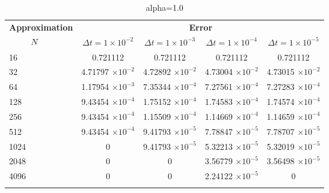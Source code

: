 	\begin{table}
		\begin{tabular}{lcccc}
			\toprule
			\multicolumn{1}{c}{\textbf{Approximation}} & \multicolumn{4}{c}{\textbf{Error}} \\
			$\hspace{9mm}N$ & $\Delta t=1\times 10^{-2}$ & $\Delta t=1\times 10^{-3}$ & $\Delta t=1\times 10^{-4}$ & $\Delta t=1\times 10^{-5}$ \\
			\midrule
			\hspace{7mm} 16 & 0.721112    & 0.721112    & 0.721112    & 0.721112    \\
			\midrule
			\hspace{7mm} 32 & 4.71797 $\times 10^{-2}$   & 4.72892 $\times 10^{-2}$   & 4.73004 $\times 10^{-2}$   & 4.73015 $\times 10^{-2}$   \\
			\midrule
			\hspace{7mm} 64 & 1.17954 $\times 10^{-3}$  & 7.35344 $\times 10^{-4}$ & 7.27561 $\times 10^{-4}$ & 7.27283 $\times 10^{-4}$  \\
			\midrule
			\hspace{7mm} 128 & 9.43454 $\times 10^{-4}$ & 1.75152 $\times 10^{-4}$ & 1.74583 $\times 10^{-4}$ & 1.74574 $\times 10^{-4}$ \\
			\midrule
			\hspace{7mm} 256 & 9.43454 $\times 10^{-4}$ & 1.15509 $\times 10^{-4}$ & 1.14669 $\times 10^{-4}$ & 1.14659 $\times 10^{-4}$ \\
			\midrule
			\hspace{7mm} 512 & 9.43454 $\times 10^{-4}$ & 9.41793 $\times 10^{-5}$ & 7.78847 $\times 10^{-5}$ & 7.78707 $\times 10^{-5}$ \\
			\midrule
			\hspace{7mm} 1024 & 0           & 9.41793 $\times 10^{-5}$ & 5.32213 $\times 10^{-5}$ & 5.32019 $\times 10^{-5}$ \\
			\midrule
			\hspace{7mm} 2048 & 0           & 0           & 3.56779 $\times 10^{-5}$ & 3.56498 $\times 10^{-5}$ \\
			\midrule
			\hspace{7mm} 4096 & 0           & 0           & 2.24122 $\times 10^{-5}$ & 0           \\
			\\
			\bottomrule
		\end{tabular}
		\caption{alpha=1.0}
	\end{table}
	
